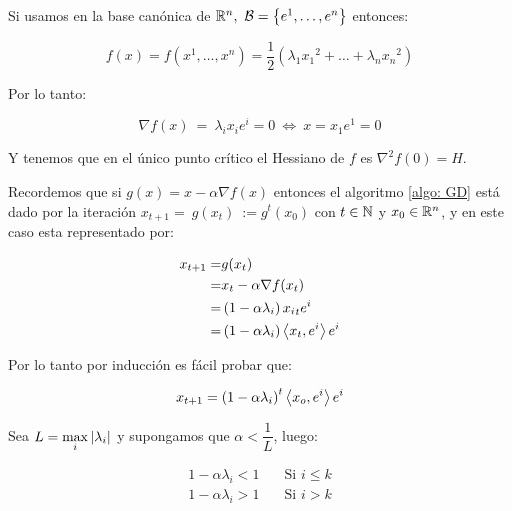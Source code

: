 \begin{example}
	
	Si usamos en la base can\'onica de $\R^n, \ \mathcal{B} = \sett{e^1, \dots, e^n}$ entonces:
	
	\begin{equation*}
	f(x) = f(x^1, \dots, x^n) = \dfrac{1}{2} \left(\lambda_1 {x_1}^2 + \dots + \lambda_n {x_n}^2\right)
	\end{equation*}
	
	Por lo tanto:
	
	\begin{equation*}
	\nabla f (x) \ = \ \lambda_i x_i e^i = 0 \ \Longleftrightarrow \ x = x_1 e^1 = 0
	\end{equation*}
	
	
	Y tenemos que en el \'unico punto cr\'itico el Hessiano de $f$ es $\nabla^2 f (0) =  H$.
	
	Recordemos que si $g(x) = x - \alpha  \nabla f(x)$ entonces el algoritmo \ref{algo: GD}  est\'a dado por la iteraci\'on $x_{t+1} = \ g(x_t) \ := g^t(x_0)$ con $t \in {\mathbb{N}}$ y $x_0 \in {\mathbb{R}}^n$, y en este caso esta representado por:
	
	\begin{equation*}
	\begin{aligned}
	x_{t+1} = & g(x_t) \\
	= & x_t - \alpha\nabla f(x_t) \\
	= & \left(1 - \alpha\lambda_i\right){x_i}_te^i \\
	= & \left(1 - \alpha\lambda_i\right)\left\langle x_t, e^i\right\rangle e^i
	\end{aligned}
	\end{equation*}
	
	Por lo tanto por inducci\'on es f\'acil probar que:
	
	
	\begin{equation*}
	x_{t+1} = \left(1 - \alpha\lambda_i\right)^t\left\langle x_o, e^i\right\rangle e^i
	\end{equation*}
	
	Sea $L = \max\limits_i\left\lvert\lambda_i\right\rvert$ y supongamos que $\alpha < \dfrac{1}{L}$, luego:
	
	\begin{equation*}
	\begin{aligned}
	1 - \alpha \lambda_i < 1 & \quad \text{Si } i \leq k \\
	1 - \alpha \lambda_i > 1 & \quad \text{Si } i > k 
	\end{aligned}
	\end{equation*}
	

\end{example}
